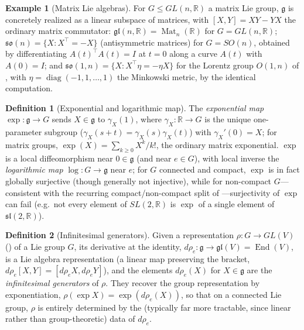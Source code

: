 \documentclass[11pt]{article}
\theoremstyle{plain}
\theoremstyle{definition}
\newtheorem{Definition}{Definition}[section]
\newtheorem{Example}{Example}[section]
\begin{document}
\begin{Example}[Matrix Lie algebras]
\label{ex:matrix-lie-algebras}
For $G \leq GL(n,\mathbb{R})$ a matrix Lie group, $\mathfrak{g}$ is
concretely realized as a linear subspace of matrices, with
$[X,Y] = XY - YX$ the ordinary matrix commutator:
$\mathfrak{gl}(n,\mathbb{R}) = \operatorname{Mat}_n(\mathbb{R})$ for
$G = GL(n,\mathbb{R})$; $\mathfrak{so}(n) = \{X : X^\top = -X\}$
(antisymmetric matrices) for $G = SO(n)$, obtained by differentiating
$A(t)^\top A(t) = I$ at $t=0$ along a curve $A(t)$ with $A(0)=I$; and
$\mathfrak{so}(1,n) = \{X : X^\top \eta = -\eta X\}$ for the Lorentz group
$O(1,n)$ of , with $\eta = \operatorname{diag}(-1,1,\dots,1)$
the Minkowski metric, by the identical computation.
\end{Example}

\begin{Definition}[Exponential and logarithmic map]
\label{def:exp-log-map}
The \emph{exponential map} $\exp : \mathfrak{g} \to G$ sends $X \in
\mathfrak{g}$ to $\gamma_X(1)$, where $\gamma_X : \mathbb{R} \to G$ is the
unique one-parameter subgroup ($\gamma_X(s+t) = \gamma_X(s)\gamma_X(t)$)
with $\gamma_X'(0) = X$; for matrix groups, $\exp(X) = \sum_{k \geq 0}
X^k/k!$, the ordinary matrix exponential. $\exp$ is a local
diffeomorphism near $0 \in \mathfrak{g}$ (and near $e \in G$), with local
inverse the \emph{logarithmic map} $\log : G \to \mathfrak{g}$ near $e$; for
$G$ connected and compact, $\exp$ is in fact globally surjective (though
generally not injective), while for non-compact $G$---consistent with the
recurring compact/non-compact split of
---surjectivity of $\exp$ can
fail (e.g.\ not every element of $SL(2,\mathbb{R})$ is $\exp$ of a single
element of $\mathfrak{sl}(2,\mathbb{R})$).
\end{Definition}

\begin{Definition}[Infinitesimal generators]
\label{def:infinitesimal-generators}
Given a representation $\rho : G \to GL(V)$
() of a Lie group $G$, its
derivative at the identity, $d\rho_e : \mathfrak{g} \to \mathfrak{gl}(V) =
\operatorname{End}(V)$, is a Lie algebra representation (a linear map preserving
the bracket, $d\rho_e[X,Y] = [d\rho_e X, d\rho_e Y]$), and the elements
$d\rho_e(X)$ for $X \in \mathfrak{g}$ are the \emph{infinitesimal
generators} of $\rho$. They recover the group representation by
exponentiation, $\rho(\exp X) = \exp(d\rho_e(X))$, so that on a connected
Lie group, $\rho$ is entirely determined by the (typically far more
tractable, since linear rather than group-theoretic) data of $d\rho_e$.
\end{Definition}
\end{document}
